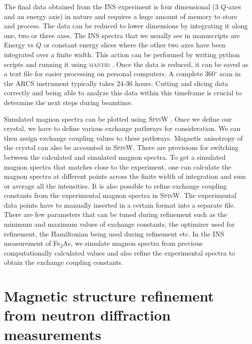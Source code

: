 \documentclass[10pt,doublespacing,edeposit]{uiucthesis2020}
\begin{document}
\begin{mainmatter}
The final data obtained from the INS experiment is four dimensional (3 $Q$-axes and an energy axis) in nature and requires a huge amount of memory to store and process. The data can be reduced to lower dimensions by integrating it along one, two or three axes. The INS spectra that we usually see in manuscripts are Energy vs $Q$ or constant energy slices where the other two axes have been integrated over a finite width. This action can be performed by writing python scripts and running it using \textsc{mantid} \cite{Arnold2014}. Once the data is reduced, it can be saved as a text file for easier processing on personal computers. A complete 360$^\circ$ scan in the ARCS instrument typically takes 24-36 hours. Cutting and slicing data correctly and being able to analyze this data within this timeframe is crucial to determine the next steps during beamtime.

Simulated magnon spectra can be plotted using \textsc{SpinW} \cite{Toth_2015}. Once we define our crystal, we have to define various exchange pathways for consideration. We can then assign exchange coupling values to these pathways. Magnetic anisotropy of the crystal can also be accounted in \textsc{SpinW}. There are provisions for switching between the calculated and simulated magnon spectra. To get a simulated magnon spectra that matches close to the experiment, one can calculate the magnon spectra at different points across the finite width of integration and sum or average all the intensities. It is also possible to refine exchange coupling constants from the experimental magnon spectra in \textsc{SpinW}. The experimental data points have to manually inserted in a certain format into a separate file. There are few parameters that can be tuned during refinement such as the minimum and maximum values of exchange constants, the optimizer used for refinement, the Hamiltonian being used during refinement etc. In the INS measurement of Fe$_2$As, we simulate magnon spectra from previous computationally calculated values and also refine the experimental spectra to obtain the exchange coupling constants.




\chapter{Magnetic structure refinement from neutron diffraction measurements}


\end{mainmatter}
\end{document}
